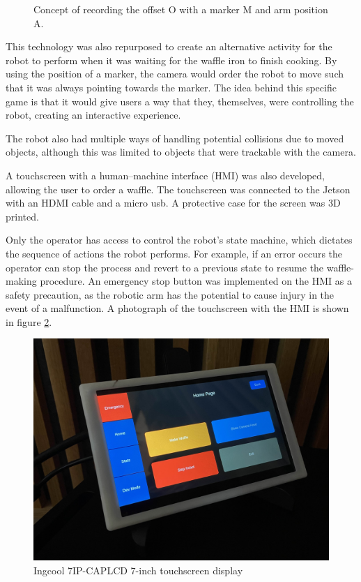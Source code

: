 \begin{figure}[h]
    \centering
    
    \caption{Concept of recording the offset O with a marker M and arm position A.}
    \label{fig:badExample}
\end{figure}
This technology was also repurposed to create an alternative activity for the robot to perform when it was waiting for the waffle iron to finish cooking. By using the position of a marker, the camera would order the robot to move such that it was always pointing towards the marker. The idea behind this specific game is that it would give users a way that they, themselves, were controlling the robot, creating an interactive experience.

The robot also had multiple ways of handling potential collisions due to moved objects, although this was limited to objects that were trackable with the camera. 

A touchscreen with a human–machine interface (HMI) was also developed, allowing the user to order a waffle. The touchscreen was connected to the Jetson with an HDMI cable and a micro usb. A protective case for the screen was 3D printed.

Only the operator has access to control the robot's state machine, which dictates the sequence of actions the robot performs. For example, if an error occurs the operator can stop the process and revert to a previous state to resume the waffle-making procedure. An emergency stop button was implemented on the HMI as a safety precaution, as the robotic arm has the potential to cause injury in the event of a malfunction. A photograph of the touchscreen with the HMI is shown in figure \ref{fig:touchscreen}.


\begin{figure}[h]
    \centering
    \includegraphics[width=1\linewidth]{figures/screen.jpg} 
    \caption{Ingcool 7IP-CAPLCD 7-inch touchscreen display}
    \label{fig:touchscreen}
\end{figure} 
